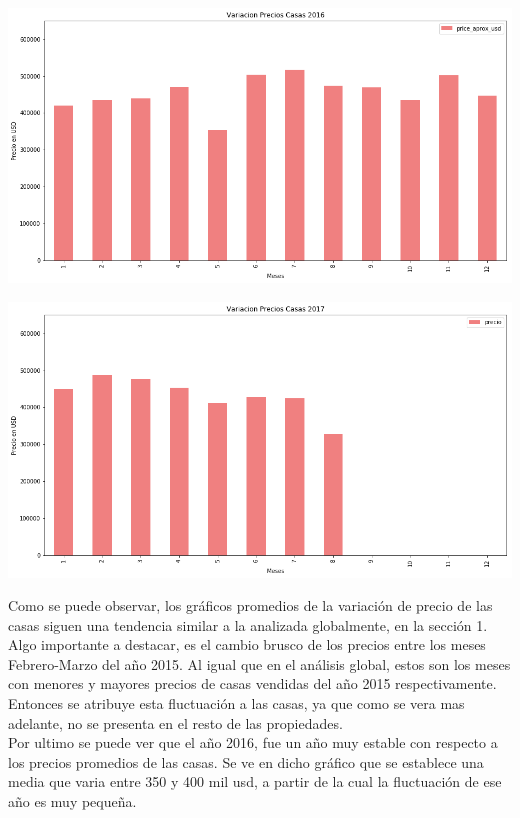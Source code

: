 \documentclass[a4paper, 10pt]{article}
\begin{document}
			\begin{center}
   		    		\includegraphics[width=\textwidth]{images/vCasa2016}
			\end{center}			
			
			\begin{center}
   		    		\includegraphics[width=\textwidth]{images/vCasa2017}
			\end{center}
			
			Como se puede observar, los gráficos promedios de la variación de precio de las casas siguen 				una tendencia similar a la analizada globalmente, en la sección 1. Algo importante a destacar, 				es el cambio brusco de los precios entre los meses Febrero-Marzo del año 2015. Al igual que en 				el análisis global, estos son los meses con menores y mayores precios de casas vendidas del año 			2015 respectivamente. Entonces se atribuye esta fluctuación a las casas, ya que como se vera 				mas adelante, no se presenta en el resto de las propiedades.
			\\
			Por ultimo se puede ver que el año 2016, fue un año muy estable con respecto a los precios 					promedios de las casas. Se ve en dicho gráfico que se establece una media que varia entre 350 y 			400 mil usd, a partir de la cual la fluctuación de ese año es muy pequeña.
\end{document}
